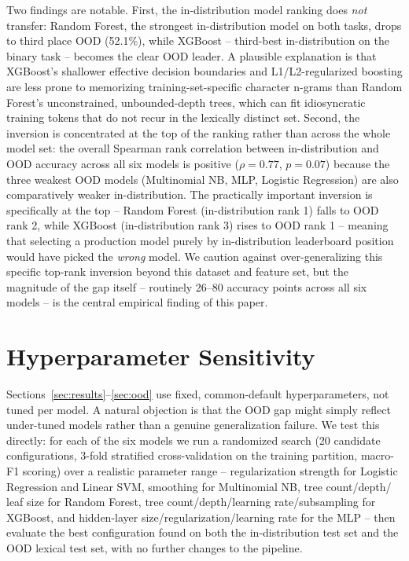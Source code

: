 \documentclass{ieeeaccess}
\begin{document}
Two findings are notable. First, the in-distribution model ranking does
\emph{not} transfer: Random Forest, the strongest in-distribution model on
both tasks, drops to third place OOD (52.1\%), while XGBoost -- third-best
in-distribution on the binary task -- becomes the clear OOD leader. A
plausible explanation is that XGBoost's shallower effective decision
boundaries and L1/L2-regularized boosting are less prone to memorizing
training-set-specific character n-grams than Random Forest's unconstrained,
unbounded-depth trees, which can fit idiosyncratic training tokens that do
not recur in the lexically distinct set. Second, the inversion is concentrated at the top of the ranking rather than
across the whole model set: the overall Spearman rank correlation between
in-distribution and OOD accuracy across all six models is positive
($\rho = 0.77$, $p = 0.07$) because the three weakest OOD models (Multinomial
NB, MLP, Logistic Regression) are also comparatively weaker in-distribution.
The practically important inversion is specifically at the top -- Random
Forest (in-distribution rank 1) falls to OOD rank 2, while XGBoost
(in-distribution rank 3) rises to OOD rank 1 -- meaning that selecting a
production model purely by in-distribution leaderboard position would have
picked the \emph{wrong} model. We caution against over-generalizing this
specific top-rank inversion beyond this dataset and feature set, but the
magnitude of the gap itself -- routinely 26--80 accuracy points across all six
models -- is the central empirical finding of this paper.

\section{Hyperparameter Sensitivity}
\label{sec:hyperparam}

Sections~\ref{sec:results}--\ref{sec:ood} use fixed, common-default
hyperparameters, not tuned per model. A natural objection is that the OOD
gap might simply reflect under-tuned models rather than a genuine
generalization failure. We test this directly: for each of the six models
we run a randomized search (20 candidate configurations, 3-fold stratified
cross-validation on the training partition, macro-F1 scoring) over a
realistic parameter range -- regularization strength for Logistic
Regression and Linear SVM, smoothing for Multinomial NB, tree count/depth/
leaf size for Random Forest, tree count/depth/learning rate/subsampling for
XGBoost, and hidden-layer size/regularization/learning rate for the MLP --
then evaluate the best configuration found on both the in-distribution test
set and the OOD lexical test set, with no further changes to the pipeline.
\end{document}
